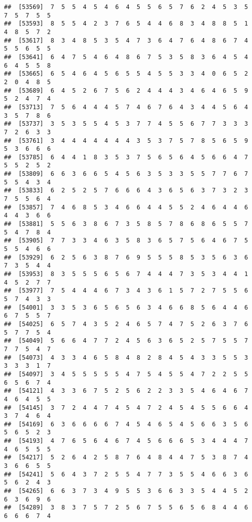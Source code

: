 \documentclass[
]{book}
\begin{document}
\begin{verbatim}
##  [53569]  7  5  5  4  5  4  6  4  5  5  6  5  7  6  2  4  5  3  5  7  5  7  5  5
##  [53593]  8  5  5  4  2  3  7  6  5  4  4  6  8  3  4  8  8  5  1  4  8  5  7  2
##  [53617]  8  3  4  8  5  3  5  4  7  3  6  4  7  6  4  8  6  7  4  5  5  6  5  5
##  [53641]  6  4  7  5  4  6  4  8  6  7  5  3  5  8  3  6  4  5  4  6  4  5  5  8
##  [53665]  6  5  4  6  4  5  6  5  5  4  5  5  3  3  4  0  6  5  2  2  0  4  8  5
##  [53689]  6  4  5  2  6  7  5  6  2  4  4  4  3  4  6  4  6  5  9  5  2  4  7  4
##  [53713]  7  5  6  4  4  4  5  7  4  6  7  6  4  3  4  4  5  6  4  3  5  7  8  6
##  [53737]  3  5  3  5  5  4  5  3  7  7  4  5  5  6  7  7  3  3  3  7  2  6  3  3
##  [53761]  3  4  4  4  4  4  4  4  3  5  3  7  5  7  8  5  6  5  9  5  3  6  6  6
##  [53785]  6  4  4  1  8  3  5  3  7  5  6  5  6  4  5  6  6  4  7  5  5  2  5  2
##  [53809]  6  6  3  6  6  5  4  5  6  3  5  3  3  5  5  7  7  6  7  5  5  4  3  4
##  [53833]  6  2  5  2  5  7  6  6  6  4  3  6  5  6  3  7  3  2  3  7  5  5  6  4
##  [53857]  7  4  6  8  5  3  4  6  6  4  4  5  5  2  4  6  4  4  6  4  4  3  6  6
##  [53881]  5  5  6  3  8  6  7  3  5  8  5  7  8  6  8  6  5  5  7  5  4  7  8  4
##  [53905]  7  7  3  3  4  6  3  5  8  3  6  5  7  5  6  4  6  7  5  5  5  4  6  6
##  [53929]  6  2  5  6  3  8  7  6  9  5  5  5  8  5  3  5  6  3  6  7  3  5  4  4
##  [53953]  8  3  5  5  5  6  5  6  7  4  4  4  7  3  5  3  4  4  1  4  5  2  7  7
##  [53977]  7  5  4  4  4  6  7  3  4  3  6  1  5  7  2  7  5  5  6  5  7  4  3  3
##  [54001]  3  3  5  3  6  5  6  5  6  3  4  6  6  8  5  6  4  4  6  6  7  5  5  7
##  [54025]  6  5  7  4  3  5  2  4  6  5  7  4  7  5  2  6  3  7  6  5  7  7  5  4
##  [54049]  5  6  6  4  7  7  2  4  5  6  3  6  5  2  5  7  5  5  7  7  7  5  4  7
##  [54073]  4  3  3  4  6  5  8  4  8  2  8  4  5  4  3  3  5  5  3  3  3  3  1  7
##  [54097]  3  4  5  5  5  5  5  4  7  5  4  5  5  4  7  2  2  5  5  6  5  6  7  4
##  [54121]  4  3  3  6  7  5  2  5  6  2  2  3  3  5  4  6  4  6  7  4  6  4  5  5
##  [54145]  3  7  2  4  4  7  4  5  4  7  2  4  5  4  5  5  6  6  4  3  7  4  6  4
##  [54169]  6  3  6  6  6  6  7  4  5  4  6  5  4  5  6  6  3  5  6  5  6  5  2  3
##  [54193]  4  7  6  5  6  4  6  7  4  5  6  6  6  5  3  4  4  4  7  4  6  5  5  5
##  [54217]  5  2  6  4  2  5  8  7  6  4  8  4  4  7  5  3  8  7  4  3  6  6  5  5
##  [54241]  5  6  4  3  7  2  5  5  4  7  7  3  5  5  4  6  6  3  6  5  6  2  4  3
##  [54265]  6  6  3  7  3  4  9  5  5  3  6  6  3  3  5  4  4  5  2  6  3  6  9  6
##  [54289]  3  8  3  7  5  7  2  5  6  7  5  5  6  5  6  8  4  4  6  6  6  6  7  4

\end{verbatim}
\end{document}
